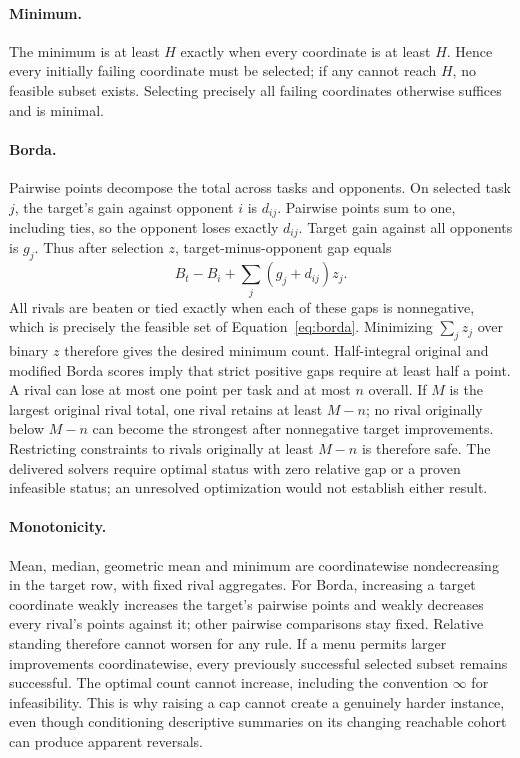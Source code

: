 \paragraph{Minimum.}
The minimum is at least $H$ exactly when every coordinate is at least $H$. Hence every initially failing coordinate must be selected; if any cannot reach $H$, no feasible subset exists. Selecting precisely all failing coordinates otherwise suffices and is minimal.

\paragraph{Borda.}
Pairwise points decompose the total across tasks and opponents. On selected task $j$, the target's gain against opponent $i$ is $d_{ij}$. Pairwise points sum to one, including ties, so the opponent loses exactly $d_{ij}$. Target gain against all opponents is $g_j$. Thus after selection $z$, target-minus-opponent gap equals
\begin{equation}
 B_t-B_i+\sum_j(g_j+d_{ij})z_j.
\end{equation}
All rivals are beaten or tied exactly when each of these gaps is nonnegative, which is precisely the feasible set of Equation~\ref{eq:borda}. Minimizing $\sum_jz_j$ over binary $z$ therefore gives the desired minimum count. Half-integral original and modified Borda scores imply that strict positive gaps require at least half a point. A rival can lose at most one point per task and at most $n$ overall. If $M$ is the largest original rival total, one rival retains at least $M-n$; no rival originally below $M-n$ can become the strongest after nonnegative target improvements. Restricting constraints to rivals originally at least $M-n$ is therefore safe. The delivered solvers require optimal status with zero relative gap or a proven infeasible status; an unresolved optimization would not establish either result.

\paragraph{Monotonicity.}
Mean, median, geometric mean and minimum are coordinatewise nondecreasing in the target row, with fixed rival aggregates. For Borda, increasing a target coordinate weakly increases the target's pairwise points and weakly decreases every rival's points against it; other pairwise comparisons stay fixed. Relative standing therefore cannot worsen for any rule. If a menu permits larger improvements coordinatewise, every previously successful selected subset remains successful. The optimal count cannot increase, including the convention $\infty$ for infeasibility. This is why raising a cap cannot create a genuinely harder instance, even though conditioning descriptive summaries on its changing reachable cohort can produce apparent reversals.
